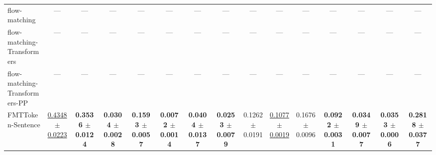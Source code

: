\begin{table}[H]
{\begin{tabular}{lcccccccccccccc}
flow-matching & — & — & — & — & — & — & — & — & — & — & — & — & — & — \\
flow-matching-Transformers & — & — & — & — & — & — & — & — & — & — & — & — & — & — \\
flow-matching-Transformers-PP & — & — & — & — & — & — & — & — & — & — & — & — & — & — \\
FMTToken-Sentence & \underline{0.4348 $\pm$ 0.0223} & \textbf{0.3536 $\pm$ 0.0124} & \textbf{0.0304 $\pm$ 0.0028} & \textbf{0.1593 $\pm$ 0.0057} & \textbf{0.0072 $\pm$ 0.0014} & \textbf{0.0404 $\pm$ 0.0137} & \textbf{0.0253 $\pm$ 0.0079} & 0.1262 $\pm$ 0.0191 & \underline{0.1077 $\pm$ 0.0019} & 0.1676 $\pm$ 0.0096 & \textbf{0.0922 $\pm$ 0.0031} & \textbf{0.0349 $\pm$ 0.0077} & \textbf{0.0353 $\pm$ 0.0006} & \textbf{0.2818 $\pm$ 0.0377} \\
\bottomrule
\end{tabular}
}
\label{tab:dbpedia14}
\end{table}

\begin{table}[H]
\centering
\caption{FPR95 on Sms}
\label{tab:sms}
\end{table}

